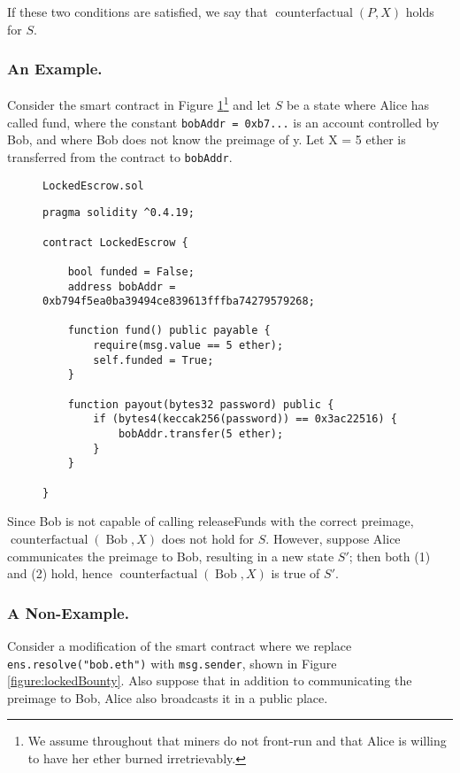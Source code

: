 \documentclass[prb,floatfix,reprint,nofootinbib,amsmath,amssymb,epsfig,pre,floats,letterpaper,groupedaffiliation,tightenlines,allcolors=blue,11pt]{revtex4}
\theoremstyle{definition}
\theoremstyle{definition}
\theoremstyle{definition}
\DeclareMathOperator{\counterfactual}{counterfactual}
\DeclareMathOperator{\Bob}{Bob}
\begin{document}
\begin{appendix}
If these two conditions are satisfied, we say that $\counterfactual(P, X)$ holds for $S$.

\subsubsection{An Example.} Consider the smart contract in Figure \ref{figure:lockedEscrow}\footnote{We assume throughout that miners do not front-run and that Alice is willing to have her ether burned irretrievably.} and let $S$ be a state where Alice has called fund, where the constant \texttt{bobAddr = 0xb7...} is an account controlled by Bob, and where Bob does not know the preimage of y. Let X = 5 ether is transferred from the contract to \texttt{bobAddr}.

\begin{figure}[H]
\begin{soliditysnippet}{\texttt{LockedEscrow.sol}}
\begin{lstlisting}[language=Solidity]
pragma solidity ^0.4.19;

contract LockedEscrow {

    bool funded = False;
    address bobAddr = 0xb794f5ea0ba39494ce839613fffba74279579268;

    function fund() public payable {
        require(msg.value == 5 ether);
        self.funded = True;
    }

    function payout(bytes32 password) public {
        if (bytes4(keccak256(password)) == 0x3ac22516) {
            bobAddr.transfer(5 ether);
        }
    }

}
\end{lstlisting}
\end{soliditysnippet}
\label{figure:lockedEscrow}
\end{figure}

Since Bob is not capable of calling releaseFunds with the correct preimage, $\counterfactual(\Bob, X)$ does not hold for $S$. However, suppose Alice communicates the preimage to Bob, resulting in a new state $S'$; then both (1) and (2) hold, hence $\counterfactual(\Bob, X)$ is true of $S'$.

\newpage
\subsubsection{A Non-Example.} Consider a modification of the smart contract where we replace \texttt{ens.resolve("bob.eth")} with \texttt{msg.sender}, shown in Figure \ref{figure:lockedBounty}. Also suppose that in addition to communicating the preimage to Bob, Alice also broadcasts it in a public place.


\end{appendix}
\end{document}
